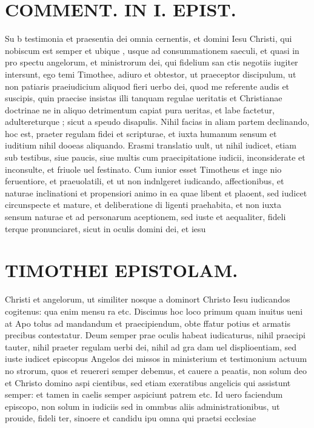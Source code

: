\documentclass{article}
\begin{document}
\begin{pages}
\section*{COMMENT. IN I. EPIST. }
\marginpar{[ p.146 ]}\pstart Su b testimonia et praesentia dei omnia cernentis, et domini Iesu Christi, qui nobiscum est semper et ubique , usque ad consummationem saeculi, et quasi in pro spectu angelorum, et ministrorum dei, qui fidelium san ctis negotiis iugiter intersunt, ego temi Timothee, adiuro et obtestor, ut praeceptor discipulum, ut non patiaris praeiudicium aliquod fieri uerbo dei, quod me referente audis et suscipis, quin praecise insistas illi tanquam regulae ueritatis et Christianae doctrinae ne in aliquo detrimentum capiat pura ueritas, et labe factetur, adultereturque ; sicut a speudo disapulis. Nihil facias in aliam partem declinando, hoc est, praeter regulam fidei et scripturae, et iuxta humanum sensum et iuditium nihil dooeas aliquando.  \pend\pstart Erasmi translatio uult, ut nihil iudicet, etiam sub testibus, siue paucis, siue multis cum praecipitatione iudicii, inconsiderate et inconsulte, et friuole uel festinato. Cum iunior esset Timotheus et inge nio feruentiore, et praeuolatili, et ut non indnlgeret iudicando, affectionibus, et naturae inclinationi et propensiori animo in ea quae libent et plaoent, sed iudicet circunspecte et mature, et deliberatione di ligenti praehabita, et non iuxta sensum naturae et ad personarum aceptionem, sed iuste et aequaliter, fideli terque pronunciaret, sicut in oculis domini dei, et iesu  \pend
\section*{TIMOTHEI EPISTOLAM. }
\marginpar{[ p.147 ]}\pstart Christi et angelorum, ut similiter nosque a dominort Christo Iesu iudicandos cogitenus: qua enim mensu ra etc. Discimus hoc loco primum quam inuitus ueni at Apo tolus ad mandandum et praecipiendum, obte ffatur potius et armatis precibus contestatur. Deum semper prae oculis habeat iudicaturus, nihil praecipi tauter, nihil praeter regulam uerbi dei, nihil ad gra dam uel displioentiam, sed iuste iudicet episcopus Angelos dei missos in ministerium et testimonium actuum no strorum, quos et reuereri semper debemus, et cauere a peaatis, non solum deo et Christo domino aspi cientibus, sed etiam exeratibus angelicis qui assistunt semper: et tamen in caelis semper aspiciunt patrem etc. Id uero faciendum episcopo, non solum in iudiciis sed in ommbus aliis administrationibus, ut prouide, fideli ter, sinoere et candidu ipu omna qui praetsi ecclesiae  \pend
{}
{}

\end{pages}
\end{document}
